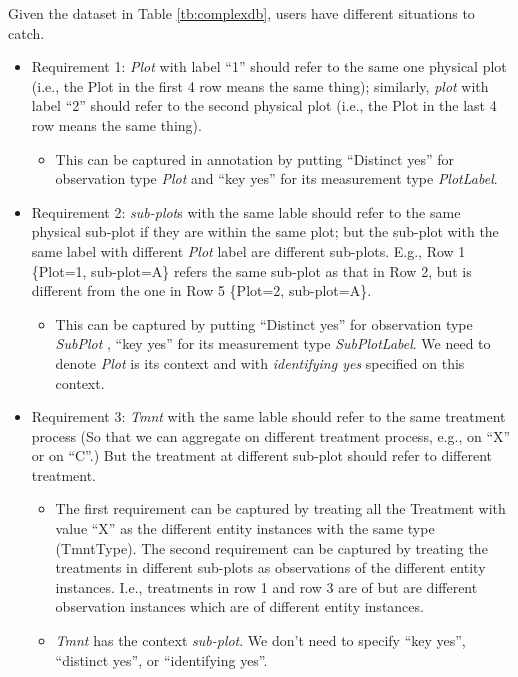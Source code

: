 \documentclass[10pt]{article}
\begin{document}
\noindent  Given the dataset in Table \ref{tb:complexdb}, users have different situations to catch. 
\begin{itemize}
\item Requirement 1: {\em Plot} with label ``1'' should refer to the same one physical plot (i.e., the Plot in the first 4 row means the same thing); similarly, 
  {\em plot} with label ``2'' should refer to the second physical plot (i.e., the Plot in the last 4 row means the same thing). 
\begin{itemize} 
\item This can be captured in annotation by putting ``Distinct yes'' for observation type {\em Plot} and ``key yes'' for its measurement type {\em PlotLabel}. 
\end{itemize}
\item Requirement 2: {\em sub-plot}s with the same lable should refer to the same physical sub-plot if they are within the same plot; 
but the sub-plot with the same label with different {\em Plot} label are different sub-plots.
E.g., Row 1 \{Plot=1, sub-plot=A\} refers the same sub-plot as that in Row 2, but is different from the one in Row 5 \{Plot=2, sub-plot=A\}. 
\begin{itemize} 
\item This can be captured by putting ``Distinct yes'' for observation type {\em SubPlot} , ``key yes'' for its measurement type {\em SubPlotLabel}. We need to denote {\em Plot} is its context and with {\em identifying yes} specified on this context. 
\end{itemize}
\item Requirement 3: {\em Tmnt} with the same lable should refer to the same treatment process (So that we can aggregate on different treatment process, e.g., on ``X'' or on ``C''.)  But the treatment at different sub-plot should refer to different treatment. 
 \begin{itemize} 
\item The first requirement can  be captured by treating all the
  Treatment with value ``X'' as the different entity instances with
  the same type (TmntType). The second requirement can be captured by
  treating the treatments in different sub-plots as observations of
  the different entity instances.  I.e., treatments in row 1 and row 3
  are of but are different observation instances which are of
  different entity instances. 
\item {\em Tmnt} has the context {\em sub-plot}. 
We don't need to specify ``key yes'', ``distinct yes'', or ``identifying yes''. 

\end{itemize}
\end{itemize}
\end{document}
